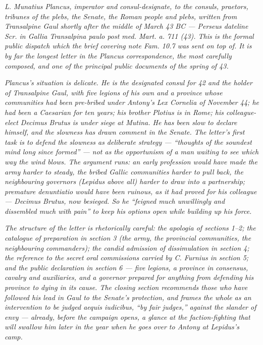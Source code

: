 
\textit{L. Munatius Plancus, imperator and consul-designate,
to the consuls, praetors, tribunes of the plebs, the Senate,
the Roman people and plebs, written from Transalpine Gaul
shortly after the middle of March 43 BC --- Perseus dateline
\textit{Scr. in Gallia Transalpina paulo post med. Mart.
a. 711 (43)}. This is the formal public dispatch which the
brief covering note Fam. 10.7 was sent on top of. It is by
far the longest letter in the Plancus correspondence, the
most carefully composed, and one of the principal public
documents of the spring of 43.}

\textit{Plancus's situation is delicate. He is the
designated consul for 42 and the holder of Transalpine
Gaul, with five legions of his own and a province whose
communities had been pre-bribed under Antony's Lex
Cornelia of November 44; he had been a Caesarian for ten
years; his brother Plotius is in Rome; his colleague-elect
Decimus Brutus is under siege at Mutina. He has been slow
to declare himself, and the slowness has drawn comment in
the Senate. The letter's first task is to defend the
slowness as deliberate strategy --- ``thoughts of the
soundest mind long since formed'' --- not as the
opportunism of a man waiting to see which way the wind
blows. The argument runs: an early profession would have
made the army harder to steady, the bribed Gallic
communities harder to pull back, the neighbouring
governors (Lepidus above all) harder to draw into a
partnership; \textit{premature denuntiatio} would have
been ruinous, as it had proved for his colleague ---
Decimus Brutus, now besieged. So he ``feigned much
unwillingly and dissembled much with pain'' to keep his
options open while building up his force.}

\textit{The structure of the letter is rhetorically careful:
the apologia of sections 1--2; the catalogue of preparation
in section 3 (the army, the provincial communities, the
neighbouring commanders); the candid admission of
dissimulation in section 4; the reference to the secret
oral commissions carried by C. Furnius in section 5; and
the public declaration in section 6 --- five legions, a
province in consensus, cavalry and auxiliaries, and a
governor prepared for anything from defending his
province to dying in its cause. The closing section
recommends those who have followed his lead in Gaul to
the Senate's protection, and frames the whole as an
intervention to be judged \textit{aequis iudicibus},
``by fair judges,'' against the slander of envy ---
already, before the campaign opens, a glance at the
faction-fighting that will swallow him later in the year
when he goes over to Antony at Lepidus's camp.}
